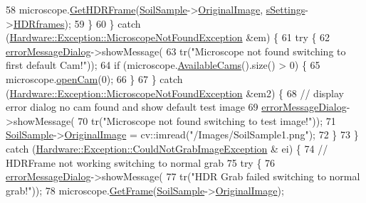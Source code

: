 \begin{DoxyCode}
58       microscope.\hyperlink{class_hardware_1_1_microscope_a8cec2eacbd3f0ea164d16100a6078d5b}{GetHDRFrame}(\hyperlink{class_v_s_a_g_u_i_ac90517c9baea0a75455d43d5eb77d3e7}{SoilSample}->\hyperlink{class_soil_analyzer_1_1_sample_a0d6e6fca9e232a77329daf0b4b29c634}{OriginalImage}, 
      \hyperlink{class_v_s_a_g_u_i_a4a0358d00aa3cb520a9a1321962b0d4d}{sSettings}->\hyperlink{class_soil_analyzer_1_1_soil_settings_a77e631ff44efe74762b5adaa2eb2cd11}{HDRframes});
59     \}
60   \} \textcolor{keywordflow}{catch} (\hyperlink{class_hardware_1_1_exception_1_1_microscope_not_found_exception}{Hardware::Exception::MicroscopeNotFoundException}
       &em) \{
61     \textcolor{keywordflow}{try} \{
62       \hyperlink{class_v_s_a_g_u_i_af01408e987e5df2ce336ee8447841c1f}{errorMessageDialog}->showMessage(
63           tr(\textcolor{stringliteral}{"Microscope not found switching to first default Cam!"}));
64       \textcolor{keywordflow}{if} (microscope.\hyperlink{class_hardware_1_1_microscope_a48c34d1597a9d90f61427cbd2a25bdb9}{AvailableCams}().size() > 0) \{
65         microscope.\hyperlink{class_hardware_1_1_microscope_abc753dfc72956ef7285d0e373fb7e1f1}{openCam}(0);
66       \}
67     \} \textcolor{keywordflow}{catch} (\hyperlink{class_hardware_1_1_exception_1_1_microscope_not_found_exception}{Hardware::Exception::MicroscopeNotFoundException}
       &em2) \{
68       \textcolor{comment}{// display error dialog no cam found and show default test image}
69       \hyperlink{class_v_s_a_g_u_i_af01408e987e5df2ce336ee8447841c1f}{errorMessageDialog}->showMessage(
70           tr(\textcolor{stringliteral}{"Microscope not found switching to test image!"}));
71       \hyperlink{class_v_s_a_g_u_i_ac90517c9baea0a75455d43d5eb77d3e7}{SoilSample}->\hyperlink{class_soil_analyzer_1_1_sample_a0d6e6fca9e232a77329daf0b4b29c634}{OriginalImage} = cv::imread(\textcolor{stringliteral}{"/Images/SoilSample1.png"});
72     \}
73   \} \textcolor{keywordflow}{catch} (\hyperlink{class_hardware_1_1_exception_1_1_could_not_grab_image_exception}{Hardware::Exception::CouldNotGrabImageException} &
      ei) \{
74     \textcolor{comment}{// HDRFrame not working switching to normal grab}
75     \textcolor{keywordflow}{try} \{
76       \hyperlink{class_v_s_a_g_u_i_af01408e987e5df2ce336ee8447841c1f}{errorMessageDialog}->showMessage(
77           tr(\textcolor{stringliteral}{"HDR Grab failed switching to normal grab!"}));
78       microscope.\hyperlink{class_hardware_1_1_microscope_a1ec5c792320ae4db3f3b39830e74f880}{GetFrame}(\hyperlink{class_v_s_a_g_u_i_ac90517c9baea0a75455d43d5eb77d3e7}{SoilSample}->\hyperlink{class_soil_analyzer_1_1_sample_a0d6e6fca9e232a77329daf0b4b29c634}{OriginalImage});

\end{DoxyCode}
